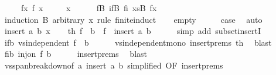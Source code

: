 \begin{isabellebody}
\ \ \ \ \ fx{\isacharcolon}{\kern0pt}\ {\isachardoublequoteopen}f\ x\ {\isacharequal}{\kern0pt}\ {}{\isachardoublequoteclose}\isanewline
\ \ \ {\isachardoublequoteopen}x\ {\isacharequal}{\kern0pt}\ {}{\isachardoublequoteclose}\isanewline
%
\isadelimproof
\ \ %
\endisadelimproof
%
\isatagproof
{}\isamarkupfalse%
\ fB\ ifB\ fi\ xsB\ fx\isanewline
{}\isamarkupfalse%
\ {\isacharparenleft}{\kern0pt}induction\ B\ arbitrary{\isacharcolon}{\kern0pt}\ x\ rule{\isacharcolon}{\kern0pt}\ finite{\isacharunderscore}{\kern0pt}induct{\isacharparenright}{\kern0pt}\isanewline
\ \ \isamarkupfalse%
\ empty\isanewline
\ \ \isamarkupfalse%
\ \isamarkupfalse%
\ {\isacharquery}{\kern0pt}case\ \isamarkupfalse%
\ auto\isanewline
{}\isamarkupfalse%
\isanewline
\ \ \isamarkupfalse%
\ {\isacharparenleft}{\kern0pt}insert\ a\ b\ x{\isacharparenright}{\kern0pt}\isanewline
\ \ \isamarkupfalse%
\ th{}{\isacharcolon}{\kern0pt}\ {\isachardoublequoteopen}f\ {\isacharbackquote}{\kern0pt}\ b\ {\isasymsubseteq}\ f\ {\isacharbackquote}{\kern0pt}\ {\isacharparenleft}{\kern0pt}insert\ a\ b{\isacharparenright}{\kern0pt}{\isachardoublequoteclose}\isanewline
\ \ \ \ \isamarkupfalse%
\ {\isacharparenleft}{\kern0pt}simp\ add{\isacharcolon}{\kern0pt}\ subset{\isacharunderscore}{\kern0pt}insertI{\isacharparenright}{\kern0pt}\isanewline
\ \ \isamarkupfalse%
\ ifb{\isacharcolon}{\kern0pt}\ {\isachardoublequoteopen}vs{}{\isachardot}{\kern0pt}independent\ {\isacharparenleft}{\kern0pt}f\ {\isacharbackquote}{\kern0pt}\ b{\isacharparenright}{\kern0pt}{\isachardoublequoteclose}\isanewline
\ \ \ \ \isamarkupfalse%
\ vs{}{\isachardot}{\kern0pt}independent{\isacharunderscore}{\kern0pt}mono\ insert{\isachardot}{\kern0pt}prems{\isacharparenleft}{\kern0pt}{}{\isacharparenright}{\kern0pt}\ th{}\ \isamarkupfalse%
\ blast\isanewline
\ \ \isamarkupfalse%
\ fib{\isacharcolon}{\kern0pt}\ {\isachardoublequoteopen}inj{\isacharunderscore}{\kern0pt}on\ f\ b{\isachardoublequoteclose}\isanewline
\ \ \ \ \isamarkupfalse%
\ insert{\isachardot}{\kern0pt}prems{\isacharparenleft}{\kern0pt}{}{\isacharparenright}{\kern0pt}\ \isamarkupfalse%
\ blast\isanewline
\ \ \isamarkupfalse%
\ vs{}{\isachardot}{\kern0pt}span{\isacharunderscore}{\kern0pt}breakdown{\isacharbrackleft}{\kern0pt}of\ a\ {\isachardoublequoteopen}insert\ a\ b{\isachardoublequoteclose}{\isacharcomma}{\kern0pt}\ simplified{\isacharcomma}{\kern0pt}\ OF\ insert{\isachardot}{\kern0pt}prems{\isacharparenleft}{\kern0pt}{}{\isacharparenright}{\kern0pt}{\isacharbrackright}{\kern0pt}\isanewline

\end{isabellebody}
